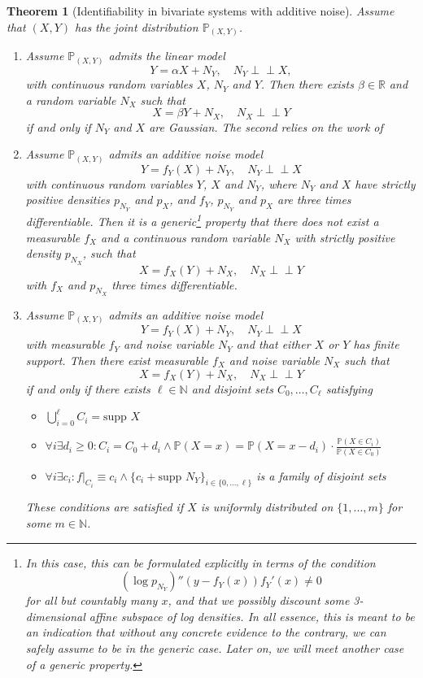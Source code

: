 \documentclass[11pt, a4paper]{memoir}
\theoremstyle{break}
\newtheorem{thm}{Theorem}
\theoremstyle{break}
\theoremstyle{nonumberplain}
\newcommand{\mN}{\mathbb{N}}
\newcommand{\mR}{\mathbb{R}}
\newcommand{\mP}{\mathbb{P}}
\newcommand{\indep}{\perp \!\!\! \perp}
\begin{document}
\begin{thm}[Identifiability in bivariate systems with additive noise]\label{id}
Assume that $(X,Y)$ has the joint distribution $\mP_{(X,Y)}$.
\begin{enumerate}[label=(\roman*)]
	\item Assume $\mP_{(X,Y)}$ admits the linear model
	$$Y=\alpha X+N_Y,\quad N_Y\indep X,$$
	with continuous random variables $X$, $N_Y$ and $Y$. Then there exists $\beta\in \mR$ and a random variable $N_X$ such that $$X=\beta Y+N_X,\quad N_X\indep Y$$
	if and only if $N_Y$ and $X$ are Gaussian. The second relies on the work of 
	\item Assume $\mP_{(X,Y)}$ admits an additive noise model
	$$Y=f_Y(X)+N_Y,\quad N_Y\indep X$$
	with continuous random variables $Y$, $X$ and $N_Y$, where $N_Y$ and $X$ have strictly positive densities $p_{N_Y}$ and $p_X$, and $f_Y$, $p_{N_Y}$ and $p_X$ are three times differentiable. Then it is a generic\footnote{In this case, this can be formulated explicitly in terms of the condition
	$$(\log p_{N_Y})''(y-f_Y(x))f_Y'(x)\neq 0$$
	for all but countably many $x$, and that we possibly discount some 3-dimensional affine subspace of log densities. In all essence, this is meant to be an indication that without any concrete evidence to the contrary, we can safely assume to be in the generic case. Later on, we will meet another case of a generic property.} property that there does not exist a measurable $f_X$ and a continuous random variable $N_X$ with strictly positive density $p_{N_X}$, such that
	$$X=f_X(Y)+N_X,\quad N_X\indep Y$$
	with $f_X$ and $p_{N_X}$ three times differentiable.
	\item Assume $\mP_{(X,Y)}$ admits an additive noise model
	$$Y=f_Y(X)+N_Y,\quad N_Y\indep X$$
	with measurable $f_Y$ and noise variable $N_Y$ and that either $X$ or $Y$ has finite support. Then there exist measurable $f_X$ and noise variable $N_X$ such that
	$$X=f_X(Y)+N_X,\quad N_X\indep Y$$
	if and only if there exists $\ell\in \mN$ and disjoint sets $C_0,\ldots, C_\ell$ satisfying
	\begin{itemize}
		\item $\bigcup_{i=0}^{\ell}C_i=\text{supp } X$
		\item $\forall i\exists d_i\geqslant 0: C_i=C_0+d_i\wedge \mP(X=x)=\mP(X=x-d_i)\cdot \frac{\mP(X\in C_i)}{\mP(X\in C_0)}$
		\item $\forall i\exists c_i: f|_{C_i}\equiv c_i\wedge \{c_i+\text{supp } N_Y\}_{i\in \{0,\ldots,\ell\}}$ is a family of disjoint sets
	\end{itemize}
	These conditions are satisfied if $X$ is uniformly distributed on $\{1,...,m\}$ for some $m\in \mN$.
\end{enumerate}
\end{thm}
\end{document}
